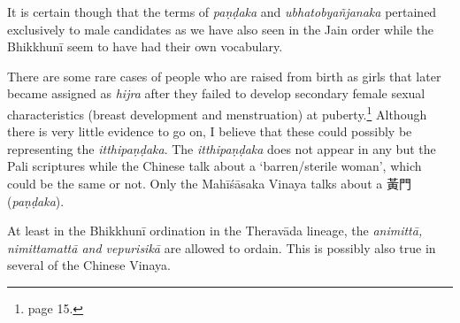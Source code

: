 It is certain though that the terms of {\em paṇḍaka} and {\em ubhatob­yañ­janaka} pertained exclusively to male candidates as we have also seen in the Jain order while the Bhikkhunī seem to have had their own vocabulary.

There are some rare cases of people who are raised from birth as girls that later became assigned as {\em hijra} after they failed to develop secondary female sexual characteristics (breast development and menstruation) at puberty.\footnote{\cite{nanda} page 15.} Although there is very little evidence to go on, I believe that these could possibly be representing the {\em itthipaṇḍaka}. The {\em itthipaṇḍaka} does not appear in any but the Pali scriptures while the Chinese talk about a `barren/sterile woman', which could be the same or not. Only the Mahīśāsaka Vinaya talks about a 黃門 ({\em paṇḍaka}). 

At least in the Bhikkhunī ordination in the Theravāda lineage, the {\em animittā, nimittamattā and vepurisikā} are allowed to ordain. This is possibly also true in several of the Chinese Vinaya.

